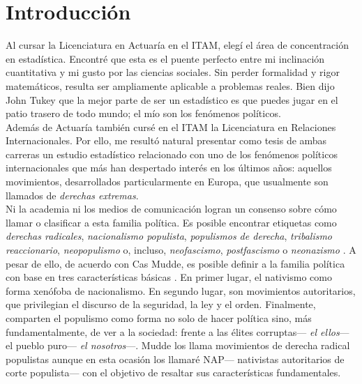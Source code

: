 \chapter*{Introducción}

Al cursar la Licenciatura en Actuaría en el ITAM, elegí el área de concentración en estadística. Encontré que esta es el puente perfecto entre mi inclinación cuantitativa y mi gusto por las ciencias sociales. Sin perder formalidad y rigor matemáticos, resulta ser ampliamente aplicable a problemas reales. Bien dijo John Tukey que la mejor parte de ser un estadístico es que puedes jugar en el patio trasero de todo mundo; el mío son los fenómenos políticos.\\

Además de Actuaría también cursé en el ITAM la Licenciatura en Relaciones Internacionales. Por ello, me resultó natural presentar como tesis de ambas carreras un estudio estadístico relacionado con uno de los fenómenos políticos internacionales que más han despertado interés en los últimos años: aquellos movimientos, desarrollados particularmente en Europa, que usualmente son llamados de \textit{derechas extremas}.\\ 

Ni la academia ni los medios de comunicación logran un consenso sobre cómo llamar o clasificar a esta familia política. Es posible encontrar etiquetas como \textit{derechas radicales}, \textit{nacionalismo populista}, \textit{populismos de derecha}, \textit{tribalismo reaccionario}, \textit{neopopulismo} o, incluso, \textit{neofascismo}, \textit{postfascismo} o \textit{neonazismo} \parencites{Mudde07a}{Mammone12}{Hainsworth16a}. A pesar de ello, de acuerdo con Cas Mudde, es posible definir a la familia política con base en tres características básicas \parencites{Mudde07a}{Beauchamp16a}. En primer lugar, el nativismo como forma xenófoba de nacionalismo. En segundo lugar, son movimientos autoritarios, que privilegian el discurso de la seguridad, la ley y el orden. Finalmente, comparten el populismo como forma no solo de hacer política sino, más fundamentalmente, de ver a la sociedad: frente a las élites corruptas--- \textit{el ellos}--- el pueblo puro--- \textit{el nosotros}---. Mudde los llama movimientos de derecha radical populistas aunque en esta ocasión los llamaré NAP--- nativistas autoritarios de corte populista--- con el objetivo de resaltar sus características fundamentales.\\

